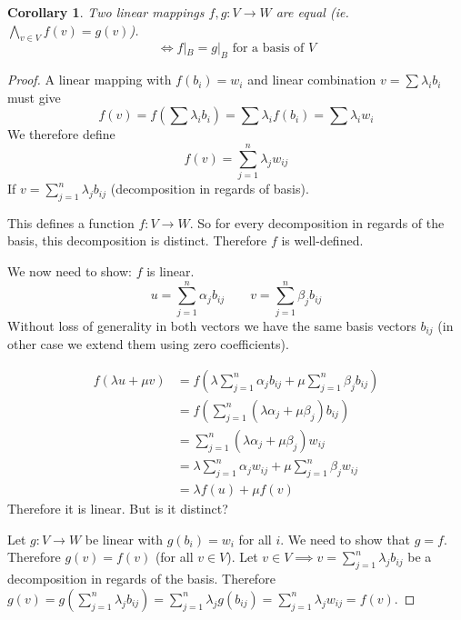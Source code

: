 \documentclass[a4paper,landscape,twocolumn]{article}
\newtheorem{cor}{Corollary}[section]
\begin{document}
\begin{cor}
  Two linear mappings $f,g: V \rightarrow W$ are equal (ie. $\bigwedge_{v \in V} f(v) = g(v)$).
  \[ \iff f|_B = g|_B \text{ for a basis of } V \]
\end{cor}
\begin{proof}
  A linear mapping with $f(b_i) = w_i$ and linear combination $v = \sum \lambda_i b_i$ must give
  \[ f(v) = f\left(\sum \lambda_i b_i\right) = \sum \lambda_i f(b_i) = \sum \lambda_i w_i \]
  We therefore define
  \[ f(v) = \sum_{j=1}^n \lambda_j w_{ij} \]
  If $v = \sum_{j=1}^n \lambda_j b_{ij}$ (decomposition in regards of basis).

  This defines a function $f: V \rightarrow W$. So for every decomposition in regards of the basis,
  this decomposition is distinct. Therefore $f$ is well-defined.

  We now need to show: $f$ is linear.
  \[ u = \sum_{j=1}^n \alpha_j b_{ij} \qquad v = \sum_{j=1}^n \beta_j b_{ij} \]
  Without loss of generality in both vectors we have the same basis vectors $b_{ij}$
  (in other case we extend them using zero coefficients).

  \begin{align*}
    f(\lambda u + \mu v) &= f\left(\lambda \sum_{j=1}^n \alpha_j b_{ij} + \mu \sum_{j=1}^n \beta_j b_{ij}\right) \\
      &= f(\sum_{j=1}^n \left(\lambda \alpha_j + \mu \beta_j\right) b_{ij}) \\
      &= \sum_{j=1}^n \left(\lambda \alpha_j + \mu \beta_j\right) w_{ij} \\
      &= \lambda \sum_{j=1}^n \alpha_j w_{ij} + \mu \sum_{j=1}^n \beta_j w_{ij} \\
      &= \lambda f(u) + \mu f(v)
  \end{align*}
  Therefore it is linear. But is it distinct?

  Let $g: V \rightarrow W$ be linear with $g(b_i) = w_i$ for all $i$.
  We need to show that $g = f$. Therefore $g(v) = f(v)$ (for all $v \in V$).
  Let $v \in V \implies v = \sum_{j=1}^n \lambda_j b_{ij}$ be a decomposition
  in regards of the basis. Therefore $g(v) = g\left(\sum_{j=1}^n \lambda_j b_{ij}\right)
  = \sum_{j=1}^n \lambda_j g(b_{ij}) = \sum_{j=1}^n \lambda_j w_{ij} = f(v)$.
\end{proof}
\end{document}
